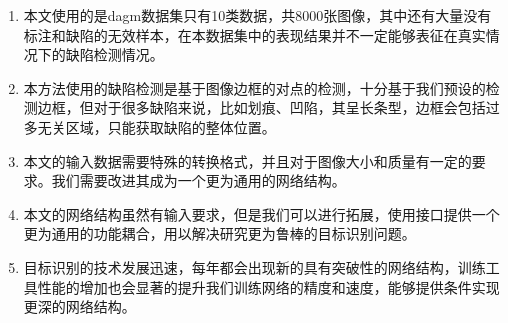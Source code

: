 \begin{enumerate}
    \item 本文使用的是dagm数据集只有10类数据，共8000张图像，其中还有大量没有标注和缺陷的无效样本，在本数据集中的表现结果并不一定能够表征在真实情况下的缺陷检测情况。
    \item 本方法使用的缺陷检测是基于图像边框的对点的检测，十分基于我们预设的检测边框，但对于很多缺陷来说，比如划痕、凹陷，其呈长条型，边框会包括过多无关区域，只能获取缺陷的整体位置。
    \item 本文的输入数据需要特殊的转换格式，并且对于图像大小和质量有一定的要求。我们需要改进其成为一个更为通用的网络结构。
    \item 本文的网络结构虽然有输入要求，但是我们可以进行拓展，使用接口提供一个更为通用的功能耦合，用以解决研究更为鲁棒的目标识别问题。
    \item 目标识别的技术发展迅速，每年都会出现新的具有突破性的网络结构，训练工具性能的增加也会显著的提升我们训练网络的精度和速度，能够提供条件实现更深的网络结构。
\end{enumerate}
